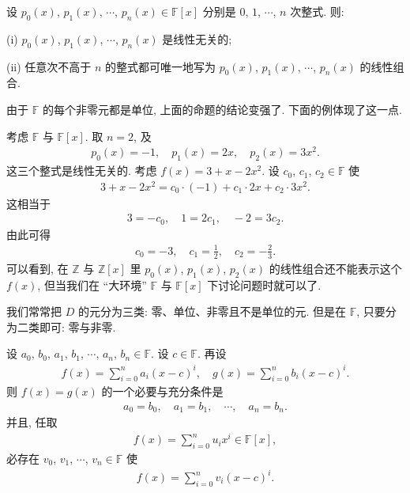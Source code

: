 \begin{proposition}
    设 $p_0 (x)$, $p_1 (x)$, $\cdots$, $p_n (x) \in \mathbb{F}[x]$ 分别是 $0$, $1$, $\cdots$, $n$ 次整式. 则:

    (i) $p_0 (x)$, $p_1 (x)$, $\cdots$, $p_n (x)$ 是线性无关的;

    (ii) 任意次不高于 $n$ 的整式都可唯一地写为 $p_0 (x)$, $p_1 (x)$, $\cdots$, $p_n (x)$ 的线性组合.
\end{proposition}

由于 $\mathbb{F}$ 的每个非零元都是单位, 上面的命题的结论变强了. 下面的例体现了这一点.

\begin{example}
    考虑 $\mathbb{F}$ 与 $\mathbb{F}[x]$. 取 $n=2$, 及
    \begin{align*}
        p_0 (x) = -1, \quad p_1 (x) = 2x, \quad p_2 (x) = 3x^2.
    \end{align*}
    这三个整式是线性无关的. 考虑 $f(x) = 3 + x - 2x^2$. 设 $c_0$, $c_1$, $c_2 \in \mathbb{F}$ 使
    \begin{align*}
        3 + x - 2x^2 = c_0 \cdot (-1) + c_1 \cdot 2x + c_2 \cdot 3x^2.
    \end{align*}
    这相当于
    \begin{align*}
        3 = -c_0, \quad 1 = 2c_1, \quad -2 = 3c_2.
    \end{align*}
    由此可得
    \begin{align*}
        c_0 = -3, \quad c_1 = \frac12, \quad c_2 = -\frac23.
    \end{align*}
    可以看到, 在 $\mathbb{Z}$ 与 $\mathbb{Z}[x]$ 里 $p_0 (x)$, $p_1 (x)$, $p_2 (x)$ 的线性组合还不能表示这个 $f(x)$, 但当我们在 ``大环境'' $\mathbb{F}$ 与 $\mathbb{F}[x]$ 下讨论问题时就可以了.
\end{example}

\begin{remark}
    我们常常把 $D$ 的元分为三类: 零、单位、非零且不是单位的元. 但是在 $\mathbb{F}$, 只要分为二类即可: 零与非零.
\end{remark}

\begin{proposition}
    设 $a_0$, $b_0$, $a_1$, $b_1$, $\cdots$, $a_n$, $b_n \in \mathbb{F}$. 设 $c \in \mathbb{F}$. 再设
    \begin{align*}
        f(x) = \sum_{i = 0}^n a_i (x-c)^i, \quad g(x) = \sum_{i = 0}^n b_i (x-c)^i.
    \end{align*}
    则 $f(x)=g(x)$ 的一个必要与充分条件是
    \begin{align*}
        a_0 = b_0, \quad a_1 = b_1, \quad \cdots, \quad a_n = b_n.
    \end{align*}
    并且, 任取
    \begin{align*}
        f(x) = \sum_{i = 0}^n u_i x^i \in \mathbb{F}[x],
    \end{align*}
    必存在 $v_0$, $v_1$, $\cdots$, $v_n \in \mathbb{F}$ 使
    \begin{align*}
        f(x) = \sum_{i = 0}^n v_i (x-c)^i.
    \end{align*}
\end{proposition}

